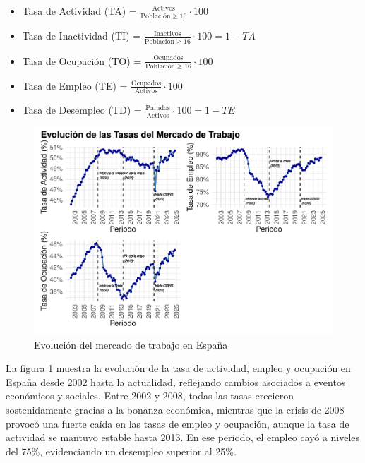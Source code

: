 \documentclass[Universitat de
València,article,submit,moreauthors,pdftex]{Definitions/mdpi}
\begin{document}
\begin{itemize}
\item
  Tasa de Actividad (TA) =
  \(\frac{\text{Activos}}{\text{Población} \geq 16}\cdot100\)
\item
  Tasa de Inactividad (TI) =
  \(\frac{\text{Inactivos}}{\text{Población} \geq 16}\cdot100 = 1 - TA\)
\item
  Tasa de Ocupación (TO) =
  \(\frac{\text{Ocupados}}{\text{Población} \geq 16}\cdot100\)
\item
  Tasa de Empleo (TE) =
  \(\frac{\text{Ocupados}}{\text{Activos}}\cdot100\)
\item
  Tasa de Desempleo (TD) =
  \(\frac{\text{Parados}}{\text{Activos}}\cdot100 = 1 - TE\)
\end{itemize}

\begin{figure}[h]

{\centering \includegraphics[width=1\linewidth]{ProyectoAED2024_files/figure-latex/unnamed-chunk-26-1} 

}

\caption{Evolución del mercado de trabajo en España}\label{fig:unnamed-chunk-26}
\end{figure}

La figura 1 muestra la evolución de la tasa de actividad, empleo y
ocupación en España desde 2002 hasta la actualidad, reflejando cambios
asociados a eventos económicos y sociales. Entre 2002 y 2008, todas las
tasas crecieron sostenidamente gracias a la bonanza económica, mientras
que la crisis de 2008 provocó una fuerte caída en las tasas de empleo y
ocupación, aunque la tasa de actividad se mantuvo estable hasta 2013. En
ese periodo, el empleo cayó a niveles del 75\%, evidenciando un
desempleo superior al 25\%.
\end{document}
